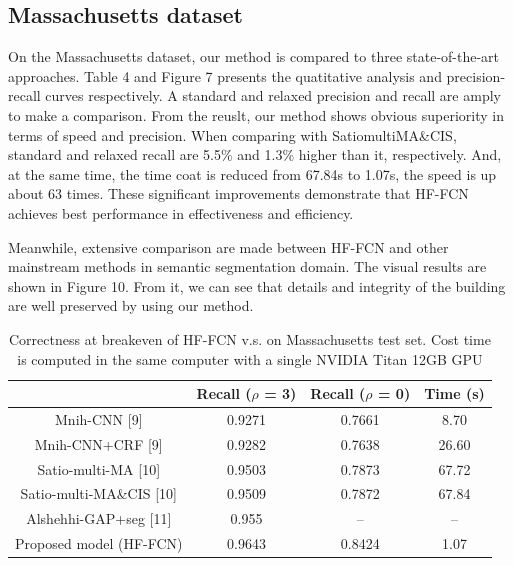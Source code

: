 \subsection{Massachusetts dataset}
On the Massachusetts dataset, our method is compared to three state-of-the-art approaches. Table 4 and Figure 7 presents the quatitative analysis and precision-recall curves respectively. A standard and relaxed precision and recall are amply to make a comparison. From the reuslt, our method shows obvious superiority in terms of speed and precision. When comparing with Satio\-multi\-MA\&CIS, standard and relaxed recall are 5.5{\%} and 1.3{\%} higher than it, respectively. And, at the same time, the time coat is reduced from 67.84s to 1.07s, the speed is up about 63 times. These significant improvements demonstrate that HF-FCN achieves best performance in effectiveness and efficiency.\par
\setlength{\parindent}{2ex}Meanwhile, extensive comparison are made between HF-FCN and other mainstream methods in semantic segmentation domain. The visual results are shown in Figure 10. From it, we can see that details and integrity of the building are well preserved by using our method.
\begin{table}
\centering
\caption {Correctness at breakeven of HF-FCN v.s. \cite{IEEEexample:mnih2013machine}\cite{IEEEexample:saito2016multiple}\cite{IEEEexample:alshehhi2017simultaneous} on Massachusetts test set. Cost time is computed in the same computer with a single NVIDIA Titan 12GB GPU}
\begin{tabular}{cccc}
\hline
&Recall ($\rho$ = 3)&Recall ($\rho$ = 0)&Time (s)\\
\hline
Mnih-CNN [9]&0.9271&0.7661&8.70\\
Mnih-CNN+CRF [9]&0.9282&0.7638&26.60\\
Satio-multi-MA [10]&0.9503&0.7873&67.72\\
Satio-multi-MA\&CIS [10]&0.9509&0.7872&67.84\\
Alshehhi-GAP+seg [11]&0.955&{--}&{--} \\
Proposed model (HF-FCN)&0.9643&0.8424&1.07\\ \hline
\end{tabular}
\end{table}

